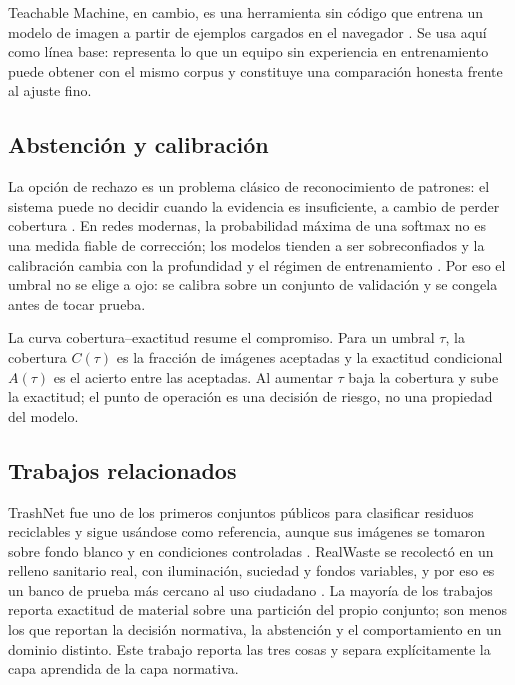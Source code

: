 \documentclass[10pt]{ieeeconf}
\begin{document}
Teachable Machine, en cambio, es una herramienta sin c\'odigo que entrena un
modelo de imagen a partir de ejemplos cargados en el navegador
\cite{teachablemachine}. Se usa aqu\'i como l\'inea base: representa lo que un
equipo sin experiencia en entrenamiento puede obtener con el mismo corpus y
constituye una comparaci\'on honesta frente al ajuste fino.

\subsection{Abstenci\'on y calibraci\'on}

La opci\'on de rechazo es un problema cl\'asico de reconocimiento de patrones: el
sistema puede no decidir cuando la evidencia es insuficiente, a cambio de perder
cobertura \cite{chow1970}. En redes modernas, la probabilidad m\'axima de una
softmax no es una medida fiable de correcci\'on; los modelos tienden a ser
sobreconfiados y la calibraci\'on cambia con la profundidad y el r\'egimen de
entrenamiento \cite{guo2017calibration}. Por eso el umbral no se elige a ojo: se
calibra sobre un conjunto de validaci\'on y se congela antes de tocar prueba.

La curva cobertura--exactitud resume el compromiso. Para un umbral $\tau$, la
cobertura $C(\tau)$ es la fracci\'on de im\'agenes aceptadas y la exactitud
condicional $A(\tau)$ es el acierto entre las aceptadas. Al aumentar $\tau$ baja
la cobertura y sube la exactitud; el punto de operaci\'on es una decisi\'on de
riesgo, no una propiedad del modelo.

\subsection{Trabajos relacionados}

TrashNet fue uno de los primeros conjuntos p\'ublicos para clasificar residuos
reciclables y sigue us\'andose como referencia, aunque sus imágenes se tomaron
sobre fondo blanco y en condiciones controladas \cite{thung2016trashnet}.
RealWaste se recolect\'o en un relleno sanitario real, con iluminaci\'on, suciedad
y fondos variables, y por eso es un banco de prueba m\'as cercano al uso
ciudadano \cite{single2023realwaste}. La mayor\'ia de los trabajos reporta
exactitud de material sobre una partici\'on del propio conjunto; son menos los que
reportan la decisi\'on normativa, la abstenci\'on y el comportamiento en un
dominio distinto. Este trabajo reporta las tres cosas y separa expl\'icitamente la
capa aprendida de la capa normativa.
\end{document}

